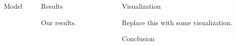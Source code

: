 \documentclass[final]{beamer}
\newlength{\sepwid}
\newlength{\onecolwid}
\newlength{\twocolwid}
\begin{document}
\begin{frame}[t]
\begin{columns}[t]
\begin{column}{\twocolwid}
\begin{columns}[t,totalwidth=\twocolwid]
\begin{column}{\onecolwid}
\begin{block}{Model}
\end{block}


\end{column} %

\begin{column}{\onecolwid} %


\begin{block}{Results}

Our results.

\end{block}


\end{column} %

\end{columns} %

\end{column} %

\begin{column}{\sepwid}\end{column} %

\begin{column}{\onecolwid} %


\begin{block}{Visualization}

Replace this with some visualization.

\end{block}


\begin{block}{Conclusion}


\end{block}
\end{column}
\end{columns}
\end{frame}
\end{document}
